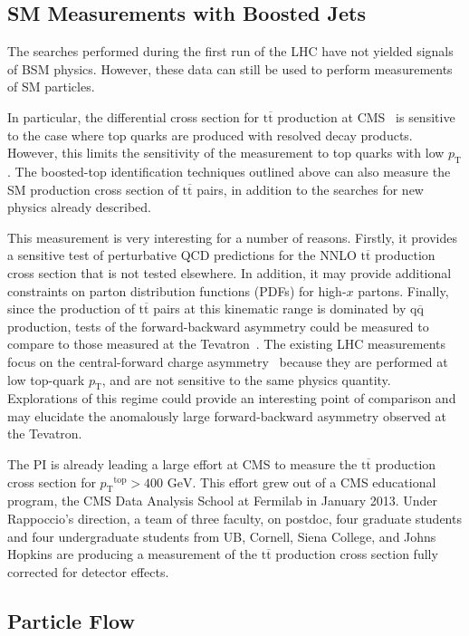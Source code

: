 \documentclass[12pt]{proposalnsf}
\newcommand{\GeVc}{\ensuremath{\mathrm{GeV}}}
\newcommand{\pt} {\ensuremath{p_\mathrm{T}}\xspace}
\newcommand{\ttbar}        {\ensuremath{\mathrm{t}\overline{\mathrm{t}}}}
\newcommand{\qqbar}        {\ensuremath{\mathrm{q}\overline{\mathrm{q}}}}
\begin{document}
\subsection{SM Measurements with Boosted Jets}
\label{sec:topxs}

The searches performed during the first run of the LHC have not
yielded signals of BSM physics. However, these data can still be used
to perform measurements of SM particles. 

In particular, the differential cross section for $\ttbar$ production
at CMS~\cite{Chatrchyan:2012saa} is sensitive to the case where top
quarks are produced with resolved decay products. However, this limits
the sensitivity of the measurement to top quarks with low $\pt$. The
boosted-top identification techniques outlined above can also measure
the SM production cross section of $\ttbar$ pairs, in addition to the
searches for new physics already described. 

This measurement is very interesting for a number of reasons. Firstly,
it provides a sensitive test of perturbative QCD predictions for the
NNLO $\ttbar$ production cross section that is not tested
elsewhere. In addition, it may provide additional constraints on
parton distribution functions (PDFs) for high-$x$ partons. Finally,
since the production of $\ttbar$ pairs at this kinematic range is
dominated by $\qqbar$ production, tests of the forward-backward
asymmetry could be measured to compare to those measured at the
Tevatron~\cite{Deliot:2013gla}. The existing LHC measurements focus on the
central-forward charge asymmetry~\cite{Chatrchyan:2011hk,ATLAS:2012an}
because they are performed at
low top-quark $\pt$, and are not sensitive to the same physics
quantity. Explorations of this regime could provide an interesting
point of comparison and may elucidate the anomalously large
forward-backward asymmetry observed at the Tevatron. 

The PI is already leading a large effort at CMS to measure the
$\ttbar$ production cross section for $\pt^\mathrm{top} > 400$
\GeVc. This effort grew out of a CMS educational program, the CMS Data
Analysis School at Fermilab in January 2013. Under
Rappoccio's direction, a team of three faculty, on postdoc, four
graduate students and four undergraduate students from UB, Cornell,
Siena College, and Johns Hopkins are producing a
measurement of the $\ttbar$ production cross section fully corrected
for detector effects. 

\subsection{Particle Flow}
\label{sec:pf}
\end{document}
